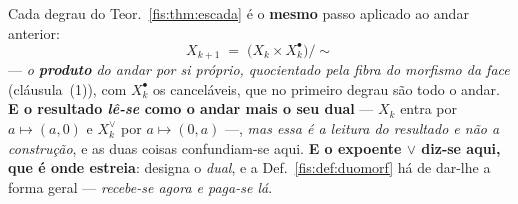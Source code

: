 \documentclass[livro.tex]{subfiles}
\begin{document}
\begin{teorema}\label{fis:thm:tecidos}
Cada degrau do Teor.~\ref{fis:thm:escada} é o \textbf{mesmo} passo aplicado ao
andar anterior:
\[
\boxed{\;X_{k+1}\;=\;\bigl(X_k\times X_k^{\bullet}\bigr)\big/\!\sim\;}
\]
--- \emph{o \textbf{produto} do andar por si próprio, quocientado pela fibra do
morfismo da face} (cláusula~(1)), com $X_k^{\bullet}$ os canceláveis, que no
primeiro degrau são todo o andar. \textbf{E o resultado \emph{lê-se} como o andar
mais o seu dual} --- $X_k$ entra por $a\mapsto(a,0)$ e $X_k^{\vee}$ por
$a\mapsto(0,a)$ ---, \emph{mas essa é a leitura do resultado e não a construção}, e
as duas coisas confundiam-se aqui. \textbf{E o expoente $\vee$ diz-se aqui, que é
onde estreia}: designa o \emph{dual}, e a Def.~\ref{fis:def:duomorf} há de dar-lhe
a forma geral --- \emph{recebe-se agora e paga-se lá}.


\end{teorema}
\end{document}
